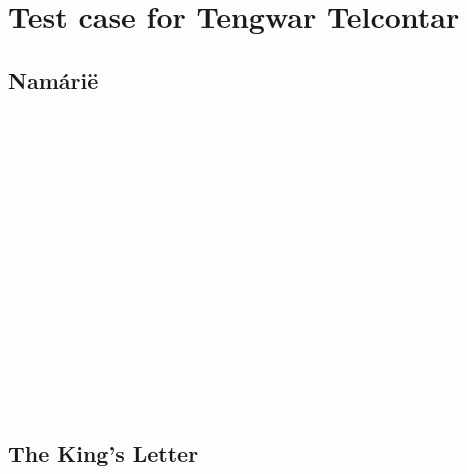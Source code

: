 \documentclass[11pt,a4paper]{article}
\begin{document}
\section*{Test case for Tengwar Telcontar}

\subsection*{Namárië}
\tengtelcq
{\rcap }       \\
        \\
     \\
 {\rcap }      \\
  

       \\
  {\rcap  }    \\
{\rcap }      \\
     \\
        \\
    {\rcap }  {\rcap }

{\rcap }   {\rcap }

   {\rcap } 

\subsection*{The King’s Letter}
\begin{center}
\tengtelcb
{\bcap  }  \\
   \\
  {\bcap } \\
     \\
    \\
     \\
    {\bcap } \\
       \\
    \\
    \\
  {\bcap }  \\
   ‍ 
\end{center}
\end{document}
